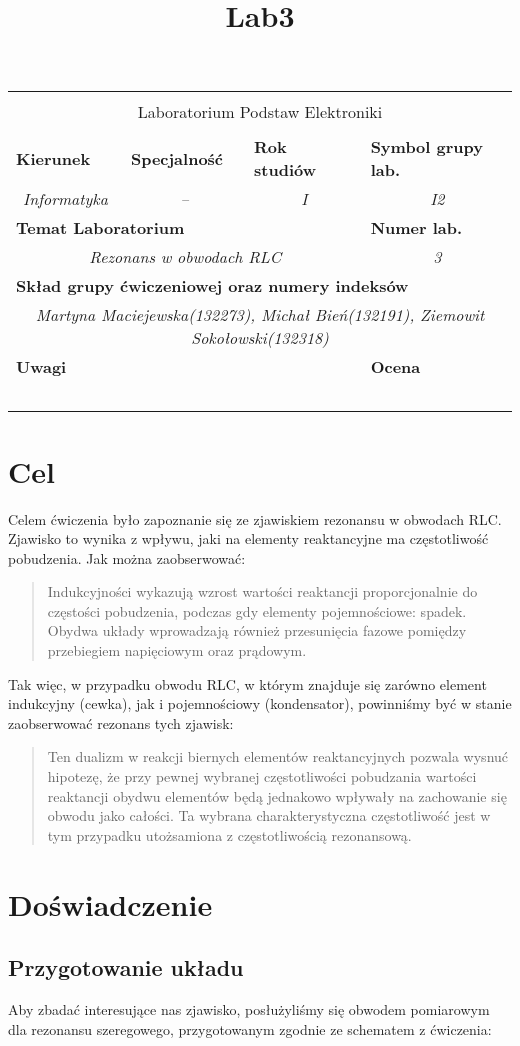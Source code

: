 \documentclass[polish,a4paper]{article}
\title{Lab3}
\newcommand{\PRzFieldDsc}[1]{\sffamily\bfseries\scriptsize #1}
\newcommand{\PRzFieldCnt}[1]{\textit{#1}}
\newcommand{\PRzHeading}[8]{
\begin{center}
\begin{tabular}{ p{0.32\textwidth} p{0.15\textwidth} p{0.15\textwidth} p{0.12\textwidth} p{0.12\textwidth} }

  &   &   &   &   \\
\hline
\multicolumn{5}{|c|}{}\\[-1ex]
\multicolumn{5}{|c|}{{\LARGE #1}}\\
\multicolumn{5}{|c|}{}\\[-1ex]

\hline
\multicolumn{1}{|l|}{\PRzFieldDsc{Kierunek}}	& \multicolumn{1}{|l|}{\PRzFieldDsc{Specjalność}}	& \multicolumn{1}{|l|}{\PRzFieldDsc{Rok studiów}}	& \multicolumn{2}{|l|}{\PRzFieldDsc{Symbol grupy lab.}} \\
\multicolumn{1}{|c|}{\PRzFieldCnt{#2}}		& \multicolumn{1}{|c|}{\PRzFieldCnt{#3}}		& \multicolumn{1}{|c|}{\PRzFieldCnt{#4}}		& \multicolumn{2}{|c|}{\PRzFieldCnt{#5}} \\

\hline
\multicolumn{4}{|l|}{\PRzFieldDsc{Temat Laboratorium}}		& \multicolumn{1}{|l|}{\PRzFieldDsc{Numer lab.}} \\
\multicolumn{4}{|c|}{\PRzFieldCnt{#6}}				& \multicolumn{1}{|c|}{\PRzFieldCnt{#7}} \\

\hline
\multicolumn{5}{|l|}{\PRzFieldDsc{Skład grupy ćwiczeniowej oraz numery indeksów}}\\
\multicolumn{5}{|c|}{\PRzFieldCnt{#8}}\\

\hline
\multicolumn{3}{|l|}{\PRzFieldDsc{Uwagi}}	& \multicolumn{2}{|l|}{\PRzFieldDsc{Ocena}} \\
\multicolumn{3}{|c|}{\PRzFieldCnt{\ }}		& \multicolumn{2}{|c|}{\PRzFieldCnt{\ }} \\

\hline
\end{tabular}
\end{center}
}
\begin{document}
\PRzHeading{Laboratorium Podstaw Elektroniki}{Informatyka}{--}{I}{I2}{Rezonans w obwodach RLC}{3}{Martyna Maciejewska(132273), Michał Bień(132191), Ziemowit Sokołowski(132318)}{}
\section{Cel}

Celem ćwiczenia było zapoznanie się ze zjawiskiem rezonansu w obwodach RLC. Zjawisko to wynika z wpływu, jaki na elementy reaktancyjne ma częstotliwość pobudzenia. Jak można zaobserwować:
\begin{quotation}
Indukcyjności wykazują wzrost wartości reaktancji proporcjonalnie do częstości pobudzenia, podczas gdy elementy pojemnościowe: spadek. Obydwa układy wprowadzają również przesunięcia fazowe pomiędzy przebiegiem napięciowym oraz prądowym.\cite{naum}
\end{quotation}
Tak więc, w przypadku obwodu RLC, w którym znajduje się zarówno element indukcyjny (cewka), jak i pojemnościowy (kondensator), powinniśmy być w stanie zaobserwować rezonans tych zjawisk:
\begin{quotation}
Ten dualizm w reakcji biernych elementów reaktancyjnych pozwala wysnuć hipotezę, że przy pewnej wybranej częstotliwości pobudzania wartości reaktancji obydwu elementów będą jednakowo wpływały na zachowanie się obwodu jako całości. Ta wybrana charakterystyczna częstotliwość jest w tym przypadku utożsamiona z częstotliwością rezonansową.\cite{naum}
\end{quotation}
\section{Doświadczenie}
\subsection{Przygotowanie układu}
Aby zbadać interesujące nas zjawisko, posłużyliśmy się obwodem pomiarowym dla rezonansu szeregowego, przygotowanym zgodnie ze schematem z ćwiczenia: 
\end{document}
